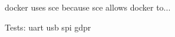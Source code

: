 \documentclass[a4paper,10pt]{report}
\begin{document}
\Gls{docker} uses \gls{sce} because \gls{sce} allows \gls{docker} to...

Tests:
\gls{uart}
\gls{usb}
\gls{spi}
\gls{gdpr}

\terml
\end{document}
